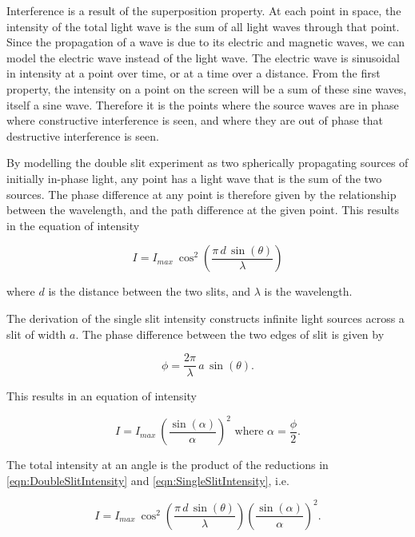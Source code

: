 Interference is a result of the superposition property. At each point in space, the intensity of the total light wave is the sum of all light waves through that point. Since the propagation of a wave is due to its electric and magnetic waves, we can model the electric wave instead of the light wave. The electric wave is sinusoidal in intensity at a point over time, or at a time over a distance. From the first property, the intensity on a point on the screen will be a sum of these sine waves, itself a sine wave. Therefore it is the points where the source waves are in phase where constructive interference is seen, and where they are out of phase that destructive interference is seen.

By modelling the double slit experiment as two spherically propagating sources of initially in-phase light, any point has a light wave that is the sum of the two sources. The phase difference at any point is therefore given by the relationship between the wavelength, and the path difference at the given point. This results in the equation of intensity 

\begin{equation}
	\label{eqn:DoubleSlitIntensity}
I = I_{max} ~ \cos^2 \left(\frac{\pi \, d \, \sin(\theta)}{\lambda}\right)
\end{equation}

where $d$ is the distance between the two slits, and $\lambda$ is the wavelength.

The derivation of the single slit intensity constructs infinite light sources across a slit of width $a$. The phase difference between the two edges of slit is given by

\begin{equation}
	\label{eqn:SingleSlitPhase}
	\phi = \frac{2 \pi}{\lambda} \, a \, \sin(\theta).
\end{equation}


This results in an equation of intensity

\begin{equation}
	\label{eqn:SingleSlitIntensity}
	I = I_{max} ~ \left( \frac{\sin({\alpha})}{\alpha} \right)^2 \text{ where } \alpha = \frac{\phi}{2}.
\end{equation}

The total intensity at an angle is the product of the reductions in \eqref{eqn:DoubleSlitIntensity} and \eqref{eqn:SingleSlitIntensity}, i.e. 

\begin{equation}
	\label{eqn:Intensity}
I = I_{max} ~ \cos^2{\left(\frac{\pi \, d \, \sin(\theta)}{\lambda}\right)} \left( \frac{\sin({\alpha})}{\alpha} \right)^2.
\end{equation}

